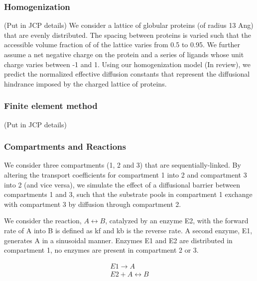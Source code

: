\subsubsection{Homogenization}
(Put in JCP details)
We consider a lattice of globular proteins (of radius 13 Ang) that are evenly distributed. The spacing between proteins is varied such that the accessible volume fraction of of the lattice varies from 0.5 to 0.95. We further assume a net negative charge on the protein and a series of ligands whose unit charge varies between -1 and 1. Using our homogenization model \cite{KekenesHuskey:lolPRe3}(In review), we predict the normalized effective diffusion constants that represent the diffusional hindrance imposed by the charged lattice of proteins. 

\subsubsection{Finite element method} 
(Put in JCP details) 

\subsubsection{Compartments and Reactions} 
\lbi
\item We consider three compartments (1, 2 and 3) that are sequentially-linked. By altering the transport coefficients for compartment 1 into 2 and compartment 3 into 2 (and vice versa), we simulate the effect of a diffusional barrier between compartments 1 and 3, such that the substrate pools in compartment 1 exchange with compartment 3 by diffusion through compartment 2. 



\item We consider the reaction, $A \leftrightarrow  B$, catalyzed by an enzyme E2, with the forward rate of
A into B is defined as kf and kb is the reverse rate. A second enzyme, E1, generates A in a sinusoidal
manner. Enzymes E1 and E2 are distributed in compartment 1, no enzymes are present in compartment 2 or 3.

\begin{align}
E1 \rightarrow A \\
E2 + A \leftrightarrow B
\end{align}

